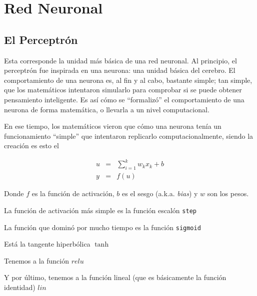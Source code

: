 \chapter{Red Neuronal}

\section{El Perceptrón}

Esta corresponde la unidad más básica de una red neuronal. Al principio, el perceptrón fue inspirada en una neurona: una unidad básica del cerebro. El comportamiento de una neurona es, al fin y al cabo, bastante simple; tan simple, que los matemáticos intentaron simularlo para comprobar si se puede obtener pensamiento inteligente. Es así cómo se ``formalizó'' el comportamiento de una neurona de forma matemática, o llevarla a un nivel computacional.


En ese tiempo, los matemáticos vieron que cómo una neurona tenía un funcionamiento ``simple'' que intentaron replicarlo computacionalmente, siendo la creación es esto el 



\begin{eqnarray}
    u &=& \sum_{i=1}^{k} w_k x_k + b\\
    y &=& f(u)
\end{eqnarray}

Donde $f$ es la función de activación, $b$ es el sesgo (a.k.a. \textit{bias}) y $w$ son los pesos.

La función de activación más simple es la función escalón \texttt{step}

    


La función que dominó por mucho tiempo es la función \texttt{sigmoid}


Está la tangente hiperbólica $\tanh$


Tenemos a la función $relu$


Y por último, tenemos a la función lineal (que es básicamente la función identidad) $lin$


